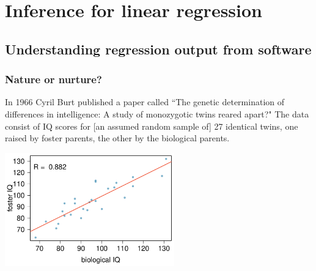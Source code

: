 \documentclass[notes,11pt, aspectratio=169]{beamer}
\begin{document}

\section{Inference for linear regression}


\subsection{Understanding regression output from software}


\begin{frame}
\frametitle{Nature or nurture?}

{\small In 1966 Cyril Burt published a paper called ``The genetic determination of differences in intelligence: A study of monozygotic twins reared apart?" The data consist of IQ scores for [an assumed random sample of] 27 identical twins, one raised by foster parents, the other by the biological parents.}

\begin{center}
\includegraphics[width=0.55\textwidth]{graphs/twins_IQ}
\end{center}

\end{frame}

\end{document}
